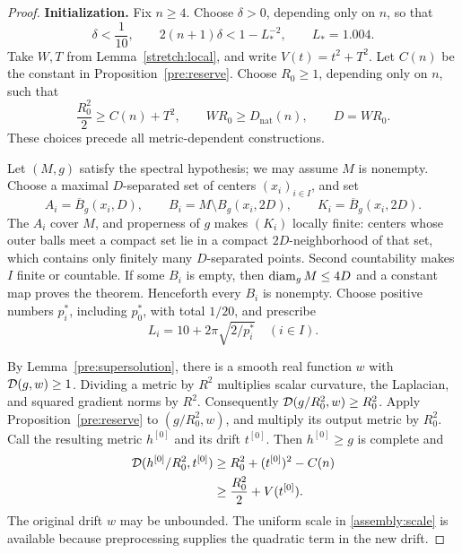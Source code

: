 \begin{proof}
\textbf{Initialization.}
Fix $n\ge4$.  Choose $\delta>0$, depending only on $n$, so that
\begin{equation}\label{assembly:delta}
 \delta<\frac1{10},\qquad
 2(n+1)\delta<1-L_*^{-2},\qquad L_*=1.004.
\end{equation}
Take $W,T$ from Lemma~\ref{stretch:local}, and write
$V(t)=t^2+T^2$.  Let $C(n)$ be the constant in
Proposition~\ref{pre:reserve}.  Choose $R_0\ge1$, depending only on $n$,
such that
\begin{equation}\label{assembly:scale}
 \frac{R_0^2}{2}\ge C(n)+T^2,
 \qquad WR_0\ge D_{\mathrm{nat}}(n),
 \qquad D=WR_0.
\end{equation}
These choices precede all metric-dependent constructions.

Let $(M,g)$ satisfy the spectral hypothesis; we may assume $M$ is
nonempty.  Choose a maximal
$D$-separated set of centers $(x_i)_{i\in I}$, and set
\[
 A_i=\overline B_g(x_i,D),\qquad
 B_i=M\setminus B_g(x_i,2D),\qquad
 K_i=\overline B_g(x_i,2D).
\]
The $A_i$ cover $M$, and properness of $g$ makes $(K_i)$ locally finite:
centers whose outer balls meet a compact set lie in a compact
$2D$-neighborhood of that set, which contains only finitely many
$D$-separated points.  Second countability makes $I$ finite or
countable.  If some $B_i$ is empty, then $\operatorname{diam}_gM\le4D$ and a
constant map proves the theorem.  Henceforth every $B_i$ is nonempty.
Choose positive numbers $p_i^*$, including $p_0^*$, with total $1/20$,
and prescribe
\begin{equation}\label{assembly:targets}
 L_i=10+2\pi\sqrt{2/p_i^*}\quad(i\in I).
\end{equation}

By Lemma~\ref{pre:supersolution}, there is a smooth real function $w$
with $\mathcal D(g,w)\ge1$.  Dividing a metric by $R^2$ multiplies scalar
curvature, the Laplacian, and squared gradient norms by $R^2$.
Consequently
$\mathcal D(g/R_0^2,w)\ge R_0^2$.  Apply Proposition~\ref{pre:reserve} to
$(g/R_0^2,w)$, and multiply its output metric by $R_0^2$.
Call the resulting metric $h^{[0]}$ and its drift $t^{[0]}$.
Then $h^{[0]}\ge g$ is complete and
\begin{align}
 \mathcal D(h^{[0]}/R_0^2,t^{[0]})
 &\ge R_0^2+(t^{[0]})^2-C(n)\notag\\
 &\ge \frac{R_0^2}{2}+V(t^{[0]}).
       \label{assembly:initial-reserve}
\end{align}
The original drift $w$ may be unbounded.  The uniform scale in
\eqref{assembly:scale} is available because preprocessing supplies
the quadratic term in the new drift.


\end{proof}
